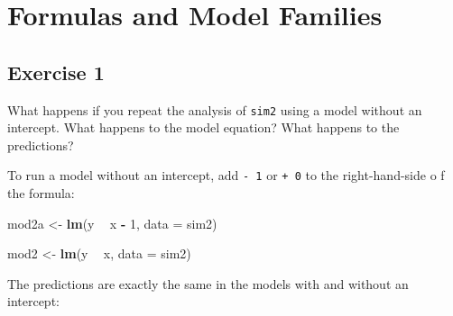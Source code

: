 \documentclass[]{book}
\newenvironment{Shaded}{\begin{snugshade}}{\end{snugshade}}
\newcommand{\CommentTok}[1]{\textcolor[rgb]{0.56,0.35,0.01}{\textit{#1}}}
\newcommand{\DataTypeTok}[1]{\textcolor[rgb]{0.13,0.29,0.53}{#1}}
\newcommand{\DecValTok}[1]{\textcolor[rgb]{0.00,0.00,0.81}{#1}}
\newcommand{\KeywordTok}[1]{\textcolor[rgb]{0.13,0.29,0.53}{\textbf{#1}}}
\newcommand{\NormalTok}[1]{#1}
\newcommand{\OperatorTok}[1]{\textcolor[rgb]{0.81,0.36,0.00}{\textbf{#1}}}
\newcommand{\StringTok}[1]{\textcolor[rgb]{0.31,0.60,0.02}{#1}}
\theoremstyle{plain}
\theoremstyle{remark}
\theoremstyle{definition}
\theoremstyle{definition}
\theoremstyle{definition}
\theoremstyle{remark}
\begin{document}
\hypertarget{formulas-and-model-families}{%
\section{Formulas and Model
Families}\label{formulas-and-model-families}}

\hypertarget{exercise-1-64}{%
\subsection{Exercise 1}\label{exercise-1-64}}

What happens if you repeat the analysis of \texttt{sim2} using a model
without an intercept. What happens to the model equation? What happens
to the predictions?

To run a model without an intercept, add \texttt{-\ 1} or \texttt{+\ 0}
to the right-hand-side o f the formula:

\begin{Shaded}
\begin{Highlighting}[]
\NormalTok{mod2a <-}\StringTok{ }\KeywordTok{lm}\NormalTok{(y }\OperatorTok{~}\StringTok{ }\NormalTok{x }\OperatorTok{-}\StringTok{ }\DecValTok{1}\NormalTok{, }\DataTypeTok{data =}\NormalTok{ sim2)}
\end{Highlighting}
\end{Shaded}

\begin{Shaded}
\begin{Highlighting}[]
\NormalTok{mod2 <-}\StringTok{ }\KeywordTok{lm}\NormalTok{(y }\OperatorTok{~}\StringTok{ }\NormalTok{x, }\DataTypeTok{data =}\NormalTok{ sim2)}
\end{Highlighting}
\end{Shaded}

The predictions are exactly the same in the models with and without an
intercept:

\begin{Shaded}
\end{Shaded}
\end{document}
